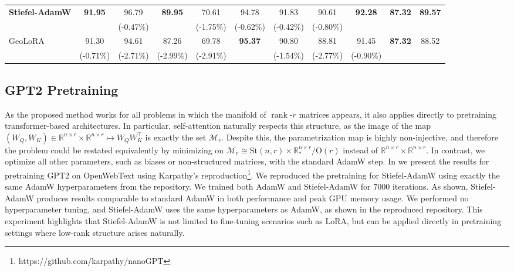 \documentclass[11pt,a4paper]{article}
\numberwithin{equation}{section}
\newcommand{\algname}{Stiefel-AdamW}
\newcommand{\tr}{^{\top}} %
\newcommand{\cM}{{\mathcal M}}          %
\newcommand{\cMr}{\cM_{r}}              %
\newcommand{\R}{\mathbb{R}}
\theoremstyle{plain}
\theoremstyle{definition}
\theoremstyle{remark}
\DeclareMathOperator{\rank}{rank}
\begin{document}
\begin{table}[t]
{\begin{tabular}{lcccccccccc}
        \multirow{2}{*}{\textbf{\algname}}  
        & \multirow{2}{*}{\textbf{91.95}} & 96.79 & \multirow{2}{*}{\textbf{89.95}} & 70.61 & 94.78 & 91.83 & 90.61 & \multirow{2}{*}{\textbf{92.28}} & \multirow{2}{*}{\textbf{87.32}} & \multirow{2}{*}{\textbf{89.57}} \\
        &  & (-0.47\%) &  & (-1.75\%) & (-0.62\%) & (-0.42\%) & (-0.80\%) &  &  & \\[0.3em]
        
        \multirow{2}{*}{GeoLoRA \cite{schotthofer2025geolora}}  
        & 91.30 & 94.61 & 87.26 & 69.78 & \multirow{2}{*}{\textbf{95.37}} & 90.80 & 88.81 & 91.45 & \multirow{2}{*}{\textbf{87.32}} & \multirow{2}{*}{88.52} \\
        & (-0.71\%) & (-2.71\%) & (-2.99\%) & (-2.91\%) &  & (-1.54\%) & (-2.77\%) & (-0.90\%) &  & \\[0.3em]
        
        \bottomrule
    \end{tabular}
    }
    \label{tab:mistral_results}
\end{table}
%
%
\subsection{GPT2 Pretraining}
As the proposed method works for all problems in which the manifold of $\rank$-$r$ matrices appears, it also applies directly to pretraining transformer-based architectures. In particular, self-attention naturally respects this structure, as the image of the map $(W_Q,W_K) \in \R^{n \times r} \times \R^{n \times r} \mapsto W_Q W_K\tr$ is exactly the set $\cMr$. Despite this, the parametrization map is highly non-injective, and therefore the problem could be restated equivalently by minimizing on $\cMr \cong \mathrm{St}(n,r) \times \R^{n \times r}_*/\mathrm{O}(r)$ instead of $\R^{n \times r} \times \R^{n \times r}$. In contrast, we optimize all other parameters, such as biases or non-structured matrices, with the standard AdamW step.
In  we present the results for pretraining GPT2 \citep{radford2019language} on OpenWebText \citep{Gokaslan2019OpenWeb} using Karpathy's reproduction\footnote{https://github.com/karpathy/nanoGPT}. We reproduced the pretraining for \algname{} using exactly the same AdamW hyperparameters from the repository. We trained both AdamW and \algname{} for $7000$ iterations. As shown, \algname{} produces results comparable to standard AdamW \citep{Loshchilov:2019} in both performance and peak GPU memory usage. We performed no hyperparameter tuning, and \algname{} uses the same hyperparameters as AdamW, as shown in the reproduced repository. This experiment highlights that \algname{} is not limited to fine-tuning scenarios such as LoRA, but can be applied directly in pretraining settings where low-rank structure arises naturally.
\end{document}
